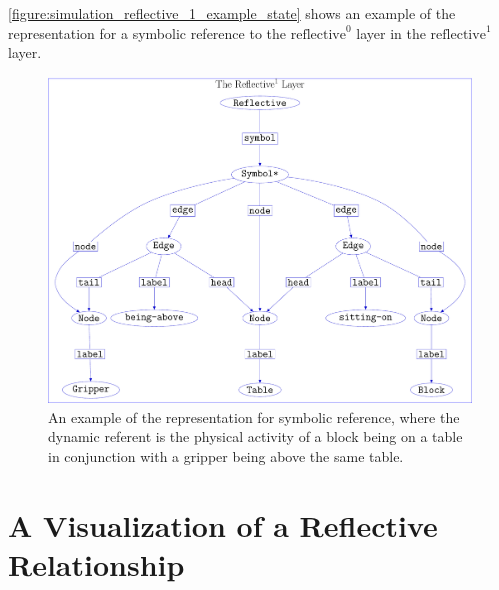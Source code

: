 {\mbox{\autoref{figure:simulation_reflective_1_example_state}}} shows
an example of the representation for a symbolic reference to the
$\text{reflective}^0$ layer in the $\text{reflective}^1$ layer.
\begin{figure}
\center
\includegraphics[width=12cm]{gfx/simulation_reflective_1_example_state}
\caption[An example of the representation for symbolic reference.]{An
  example of the representation for symbolic reference, where the
  dynamic referent is the physical activity of a block being on a
  table in conjunction with a gripper being above the same table.}
\label{figure:simulation_reflective_1_example_state}
\end{figure}

\section{A Visualization of a Reflective Relationship}

